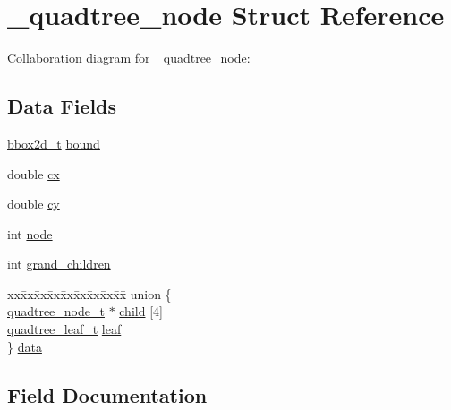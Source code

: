 \hypertarget{struct__quadtree__node}{}\section{\+\_\+quadtree\+\_\+node Struct Reference}
\label{struct__quadtree__node}


Collaboration diagram for \+\_\+quadtree\+\_\+node\+:
\subsection*{Data Fields}
\begin{DoxyCompactItemize}
\item 
\hyperlink{bbox2d_8h_a1c61505f6f1c486a673ba4547602b9df}{bbox2d\+\_\+t} \hyperlink{struct__quadtree__node_ae7ad530aa3d2191e2039867a9699bdd9}{bound}
\item 
double \hyperlink{struct__quadtree__node_a38a4256186a36066306a04b1c2be35fb}{cx}
\item 
double \hyperlink{struct__quadtree__node_a35d069b1ce9dbfb2f5e076f73650b12c}{cy}
\item 
int \hyperlink{struct__quadtree__node_a34ce0a3ded8087cfbe58e637f07d2dc3}{node}
\item 
int \hyperlink{struct__quadtree__node_a440a869717a3b5d9700101d013f397e6}{grand\+\_\+children}
\item 
\begin{tabbing}
xx\=xx\=xx\=xx\=xx\=xx\=xx\=xx\=xx\=\kill
union \{\\
\>\hyperlink{quadtree_8c_ad63e20da3252f1c7ac0ec1fb59ab1e61}{quadtree\_node\_t} $\ast$ \hyperlink{struct__quadtree__node_ac18415fd1443c1a44323ce4867b717b7}{child} \mbox{[}4\mbox{]}\\
\>\hyperlink{quadtree_8c_a587c3c1eecbb2ec8d1c244316581bfdd}{quadtree\_leaf\_t} \hyperlink{struct__quadtree__node_a3f18cf00c4055c9474dad3ca25f4b6f4}{leaf}\\
\} \hyperlink{struct__quadtree__node_a443be2ffd807ed9551ed1fc61b21276f}{data}\\

\end{tabbing}\end{DoxyCompactItemize}


\subsection{Field Documentation}
